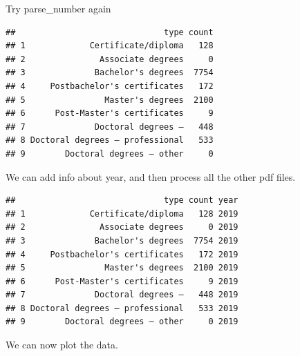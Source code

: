 \documentclass[
]{book}
\newenvironment{Shaded}{\begin{snugshade}}{\end{snugshade}}
\newcommand{\CommentTok}[1]{\textcolor[rgb]{0.56,0.35,0.01}{\textit{#1}}}
\newcommand{\DataTypeTok}[1]{\textcolor[rgb]{0.13,0.29,0.53}{#1}}
\newcommand{\DecValTok}[1]{\textcolor[rgb]{0.00,0.00,0.81}{#1}}
\newcommand{\KeywordTok}[1]{\textcolor[rgb]{0.13,0.29,0.53}{\textbf{#1}}}
\newcommand{\NormalTok}[1]{#1}
\newcommand{\OperatorTok}[1]{\textcolor[rgb]{0.81,0.36,0.00}{\textbf{#1}}}
\newcommand{\StringTok}[1]{\textcolor[rgb]{0.31,0.60,0.02}{#1}}
\begin{document}
Try parse\_number again

\begin{Shaded}
\end{Shaded}

\begin{verbatim}
##                              type count
## 1             Certificate/diploma   128
## 2               Associate degrees     0
## 3              Bachelor's degrees  7754
## 4     Postbachelor's certificates   172
## 5                Master's degrees  2100
## 6      Post-Master's certificates     9
## 7              Doctoral degrees –   448
## 8 Doctoral degrees – professional   533
## 9        Doctoral degrees – other     0
\end{verbatim}

We can add info about year, and then process all the other pdf files.

\begin{Shaded}
\end{Shaded}

\begin{verbatim}
##                              type count year
## 1             Certificate/diploma   128 2019
## 2               Associate degrees     0 2019
## 3              Bachelor's degrees  7754 2019
## 4     Postbachelor's certificates   172 2019
## 5                Master's degrees  2100 2019
## 6      Post-Master's certificates     9 2019
## 7              Doctoral degrees –   448 2019
## 8 Doctoral degrees – professional   533 2019
## 9        Doctoral degrees – other     0 2019
\end{verbatim}

We can now plot the data.
\end{document}
